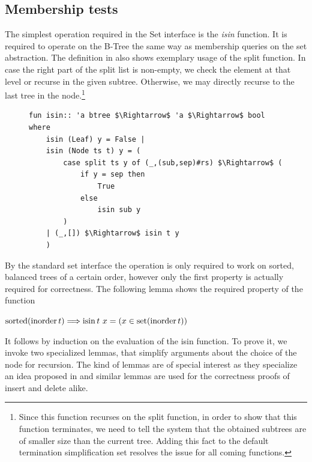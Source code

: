 \subsection{Membership tests}

The simplest operation required in the Set interface is
the \textit{isin} function.
It is required to operate on the B-Tree 
the same way as membership queries on the set abstraction.
The definition in  also shows exemplary usage of the split function.
In case the right part of the split list is non-empty,
we check the element at that level or recurse in the given subtree.
Otherwise, we may directly recurse to the last tree in the node.\footnote{
    Since this function recurses on the split function,
    in order to show that this function terminates, we need to tell
    the system that the obtained subtrees are of smaller size than the current tree.
    Adding this fact to the default termination simplification set resolves
    the issue for all coming functions.
}

\begin{figure}
\begin{lstlisting}[mathescape=true, language=Isabelle, caption=The \textit{isin} function, label=lst:isin-fun]
fun isin:: 'a btree $\Rightarrow$ 'a $\Rightarrow$ bool where
    isin (Leaf) y = False |
    isin (Node ts t) y = (
        case split ts y of (_,(sub,sep)#rs) $\Rightarrow$ (
            if y = sep then
                True
            else
                isin sub y
        )
    | (_,[]) $\Rightarrow$ isin t y
    )
\end{lstlisting}
\end{figure}

By the standard set interface the operation is only required to work on
sorted, balanced trees of a certain order, however only the first property
is actually required for correctness.
The following lemma shows the required property of the function

\begin{theorem}
    \label{thm:isin-set}
    $\operatorname{sorted} (\operatorname{inorder} t) \Longrightarrow \operatorname{isin} t\ x = (x \in \operatorname{set} (\operatorname{inorder} t))$
\end{theorem}

It follows by induction on the evaluation of the isin function.
To prove it, we invoke two specialized lemmas,
that simplify arguments about the choice of the node for recursion.
The kind of lemmas are of special interest as they specialize
an idea proposed in \parencite{DBLP:conf/itp/Nipkow16} and similar lemmas
are used for the correctness proofs of insert and delete alike.

